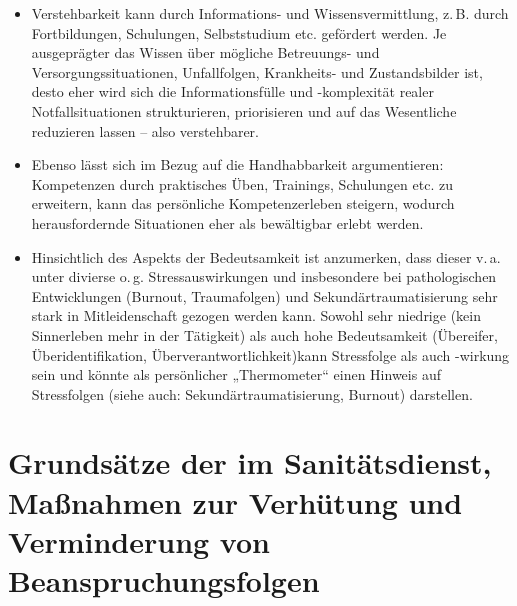 {\begin{itemize}
  \item Verstehbarkeit kann durch Informations- und
  Wissensvermittlung, z.\,B. durch Fortbildungen, Schulungen,
  Selbststudium etc. gefördert werden. Je ausgeprägter das
  Wissen über mögliche Betreuungs- und
  Versorgungssituationen, Unfallfolgen, Krankheits- und
  Zustandsbilder ist, desto eher wird sich die
  Informationsfülle und -komplexität realer Notfallsituationen strukturieren,
  priorisieren und auf das Wesentliche reduzieren lassen --
  also verstehbarer.
  
  \item Ebenso lässt sich im Bezug auf die Handhabbarkeit
  argumentieren: Kompetenzen durch praktisches Üben,
  Trainings, Schulungen etc. zu erweitern, kann das
  persönliche Kompetenzerleben steigern, wodurch herausfordernde
  Situationen eher als bewältigbar erlebt werden.
  
  \item Hinsichtlich des Aspekts der Bedeutsamkeit ist
  anzumerken, dass dieser v.\,a. unter divierse o.\,g.
  Stressauswirkungen und insbesondere bei pathologischen
  Entwicklungen (Burnout, Traumafolgen) und
  Sekundärtraumatisierung sehr stark in Mitleidenschaft
  gezogen werden kann. Sowohl sehr niedrige (kein
  Sinnerleben mehr in der Tätigkeit) als auch hohe
  Bedeutsamkeit (Übereifer, Überidentifikation,
  Überverantwortlichkeit)kann Stressfolge als auch -wirkung
  sein und könnte als persönlicher „Thermometer“ einen
  Hinweis auf Stressfolgen (siehe auch:
  Sekundärtraumatisierung, Burnout) darstellen.
\end{itemize}

}%


\section{Grundsätze der  im 
Sanitätsdienst, Maßnahmen zur Verhütung und Verminderung von 
Beanspruchungsfolgen }

